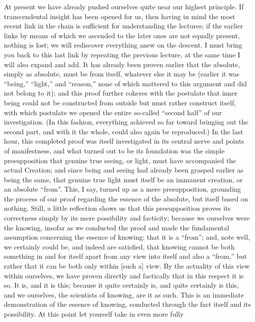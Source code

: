 At present we have already pushed ourselves
quite near our highest principle.
If transcendental insight has been opened for us,
then having in mind the most recent link in the chain is
sufficient for understanding the lectures;
if the earlier links by means of which we ascended
to the later ones are not equally present, nothing is lost;
we will rediscover everything anew on the descent.
I must bring you back to this last link by repeating
the previous lecture, at the same time I will also expand and add.
It has already been proven earlier that the absolute,
simply as absolute, must be from itself,
whatever else it may be
(earlier it was “being,” “light,” and “reason,”
none of which mattered to this argument and did not belong to it);
and this proof further coheres with the postulate
that inner being could not be constructed from
outside but must rather construct itself,
with which postulate we opened the entire
so-called “second half” of our investigation.
(In this fashion, everything achieved so far toward
bringing out the second part, and with it the whole,
could also again be reproduced.)
In the last hour, this completed proof was
itself investigated in its central nerve
and points of manifestness,
and what turned out to be its foundation was
the simple presupposition that genuine true seeing,
or light, must have accompanied the actual Creation;
and since being and seeing had already been grasped earlier
as being the same, that genuine true light must itself be
an immanent creation, or an absolute “from”.
This, I say, turned up as a mere presupposition,
grounding the process of our proof regarding
the essence of the absolute, but itself based on nothing.
Still, a little reflection shows us that
this presupposition proves its correctness
simply by its mere possibility and facticity;
because we ourselves were the knowing,
insofar as we conducted the proof and
made the fundamental assumption concerning the essence of knowing:
that it is a “from”;
and, note well, we certainly could be, and indeed are satisfied,
that knowing cannot be both something in and for itself
apart from any view into itself and also a “from,”
but rather that it can be both only within [such a] view.
By the actuality of this view within ourselves,
we have proven directly and factically that in this respect it is so.
It is, and it is this;
because it quite certainly is,
and quite certainly is this,
and we ourselves, the scientists of knowing,
are it as such.
This is an immediate demonstration of the essence of knowing,
conducted through the fact itself and its possibility.
At this point let yourself take in even more fully
